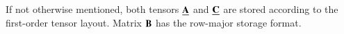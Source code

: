 If not otherwise mentioned, both tensors $\underline{\mathbf{A}}$ and $\underline{\mathbf{C}}$ are stored according to the first-order tensor layout.
Matrix $\mathbf{B}$ has the row-major storage format.


